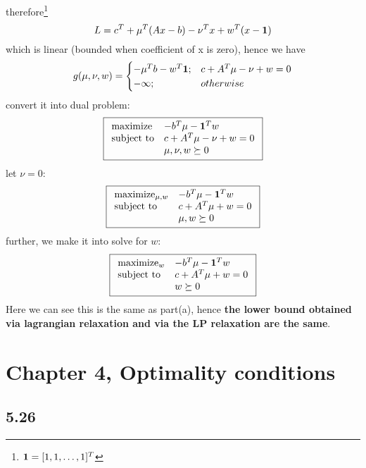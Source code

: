 \documentclass{article}
\begin{document}
therefore\footnote{ ${\bf 1} = [1,1, \dots, 1]^T$}
\[L = c^T + \mu^T(Ax-b) - \nu^Tx + w^T(x -  {\bf 1)}\]
which is linear (bounded when coefficient of x is zero), hence we have 
\[g(\mu,\nu,w) = \begin{cases}
-\mu^Tb -w^T{\bf 1}; & c+ A^T\mu-\nu + w = 0\\
-\infty ; & otherwise
\end{cases}
\]
convert it into dual problem:
  \[  \boxed{  \begin{array}{ll}
    \mbox{maximize}   &   -b^T\mu -{\bf 1}^Tw \\
    \mbox{subject to} &c+ A^T\mu-\nu + w = 0 \\
    & \mu, \nu, w \succeq 0  
         \end{array} 
         }
  \]   
  let $\nu = 0 $: 
  \[  \boxed{  \begin{array}{ll}
    \mbox{maximize}_{\mu, w}   &   -b^T\mu -{\bf 1}^Tw \\
    \mbox{subject to} &c+ A^T\mu + w = 0 \\
    & \mu, w \succeq 0  
         \end{array} 
         }
  \]   
  further, we make it into solve for $w$:
  \[  \boxed{  \begin{array}{ll}
    \mbox{maximize}_{ w}   &   -b^T\mu -{\bf 1}^Tw \\
    \mbox{subject to} &c+ A^T\mu + w = 0 \\
    &  w \succeq 0  
         \end{array} 
         }
  \]
 Here we can see this is the same as part(a), hence {\bf the lower bound obtained via lagrangian relaxation and via the LP relaxation are the same}. 
  
\section*{Chapter 4, Optimality conditions}	
\subsection*{5.26}
\end{document}
